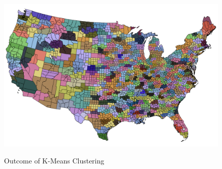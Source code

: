 \begin{figure}[th]
\caption{Outcome of K-Means Clustering}
\includegraphics[width=.9\textwidth]{./figures/fastclus_map.png}
\label{fig:fastclusmap}
\end{figure}

